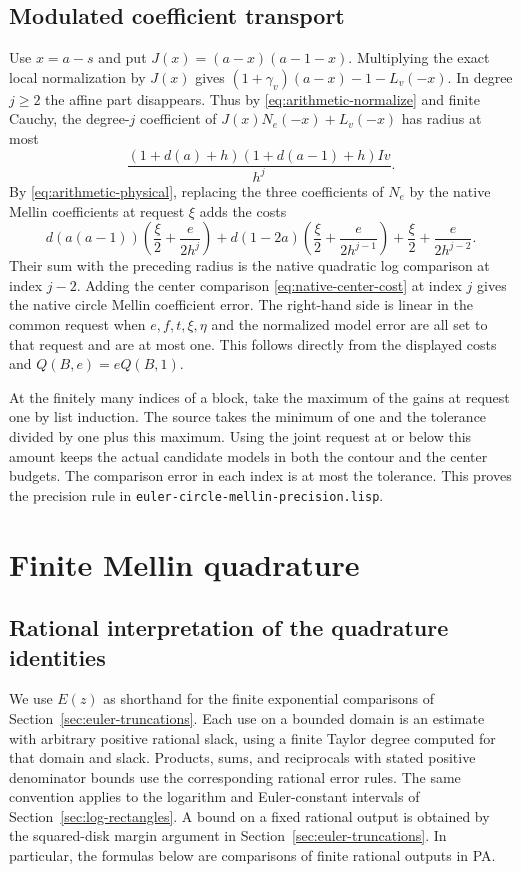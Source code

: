 \documentclass[11pt]{amsart}
\theoremstyle{definition}
\theoremstyle{remark}
\numberwithin{equation}{section}
\newcommand{\code}[1]{\nolinkurl{#1}}
\begin{document}
\subsection{Modulated coefficient transport}

Use \(x=a-s\) and put \(J(x)=(a-x)(a-1-x)\).
Multiplying the exact local normalization by \(J(x)\)
gives \((1+\gamma_v)(a-x)-1-L_v(-x)\).
In degree \(j\ge2\) the affine part disappears.
Thus by \eqref{eq:arithmetic-normalize}
and finite Cauchy, the degree-$j$ coefficient of
\(J(x)N_e(-x)+L_v(-x)\) has radius at most
\[
          \frac{(1+d(a)+h)(1+d(a-1)+h) I v}{h^j}.
\]
By \eqref{eq:arithmetic-physical}, replacing the
three coefficients of $N_e$ by the native Mellin
coefficients at request $\xi$ adds the costs
\[
    d(a(a-1))\left(\frac{\xi}{2}+\frac{e}{2h^j}\right)
   +d(1-2a)\left(\frac{\xi}{2}+\frac{e}{2h^{j-1}}\right)
              +\frac{\xi}{2}+\frac{e}{2h^{j-2}}.
\]
Their sum with the preceding radius is the native
quadratic log comparison at index $j-2$.
Adding the center comparison \eqref{eq:native-center-cost}
at index $j$ gives the native circle Mellin
coefficient error. The right-hand side is linear
in the common request when \(e,f,t,\xi,\eta\) and the
normalized model error are all set to that request
and are at most one. This follows directly from
the displayed costs and \(Q(B,e)=eQ(B,1)\).

At the finitely many indices of a block, take the
maximum of the gains at request one by list
induction. The source takes the minimum of one and
the tolerance divided by one plus this maximum.
Using the joint request at or below this amount
keeps the actual candidate models in both the
contour and the center budgets. The comparison
error in each index is at most the tolerance.
This proves the precision rule in
\code{euler-circle-mellin-precision.lisp}.

\section{Finite Mellin quadrature}
\label{sec:finite-mellin}

\subsection{Rational interpretation of the quadrature identities}
\label{sec:quadrature-interpretation}

We use \(E(z)\) as shorthand for the finite exponential comparisons of
Section~\ref{sec:euler-truncations}. Each use on a bounded domain is an
estimate with arbitrary positive rational slack, using a finite Taylor
degree computed for that domain and slack. Products, sums, and
reciprocals with stated positive denominator bounds use the
corresponding rational error rules. The same convention applies to
the logarithm and Euler-constant intervals of
Section~\ref{sec:log-rectangles}. A bound on a fixed rational output is
obtained by the squared-disk margin argument in
Section~\ref{sec:euler-truncations}. In particular, the formulas below are
comparisons of finite rational outputs in PA.
\end{document}

